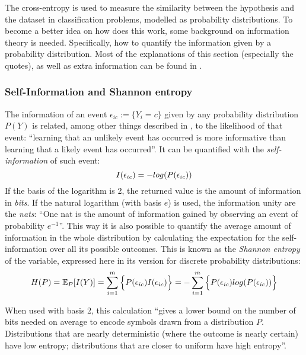 The cross-entropy is used to measure the similarity between the hypothesis and the dataset in classification problems, modelled as probability distributions. To become a better idea on how does this work, some background on information theory is needed. Specifically, how to quantify the information given by a probability distribution. Most of the explanations of this section (especially the quotes), as well as extra information can be found in \cite[p.73]{goodfellow}.
\subsubsection{Self-Information and Shannon entropy}

The information of an event \(\epsilon_{ic} := \{Y_i=c\}\) given by any probability distribution \(P(Y)\) is related, among other things described in \cite[p.73]{goodfellow}, to the likelihood of that event: ``learning that an unlikely event has occurred is more informative than learning that a likely event has occurred''. It can be quantified with the {\it self-information} of such event:
\begin{equation*}
  I(\epsilon_{ic}) = -log(P(\epsilon_{ic}))\\[3mm]
\end{equation*}
If the basis of the logarithm is 2, the returned value is the amount of information in {\it bits}. If the natural logarithm (with basis \(e\)) is used, the information unity are the {\it nats}: ``One nat is the amount of information gained by observing an event of probability \(e^{-1}\)''\cite[p.73]{goodfellow}. This way it is also possible to quantify the average amount of information in the whole distribution by calculating the expectation for the self-information over all its possible outcomes. This is known as the {\it Shannon entropy} of the variable, expressed here in its version for discrete probability distributions:
\begin{equation*}
  H(P) = \mathbb{E}_P[I(Y)] =  \sum_{i=1}^{m} \Big\{P(\epsilon_{ic}) I(\epsilon_{ic}) \Big\} =  - \sum_{i=1}^{m} \Big\{P(\epsilon_{ic}) log(P(\epsilon_{ic})) \Big\}\\[3mm]
\end{equation*}

When used with basis 2, this calculation ``gives a lower bound on the number of bits needed on average to encode symbols drawn from a distribution \(P\). Distributions that are nearly deterministic (where the outcome is nearly certain) have low entropy; distributions that are closer to uniform have high entropy''.

